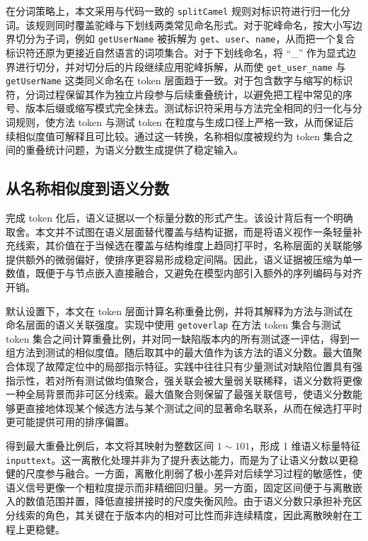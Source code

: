 在分词策略上，本文采用与代码一致的 \texttt{splitCamel} 规则对标识符进行归一化分词。该规则同时覆盖驼峰与下划线两类常见命名形式。对于驼峰命名，按大小写边界切分为子词，例如 \texttt{getUserName} 被拆解为 \texttt{get}、\texttt{user}、\texttt{name}，从而把一个复合标识符还原为更接近自然语言的词项集合。对于下划线命名，将 ``\_'' 作为显式边界进行切分，并对切分后的片段继续应用驼峰拆解，从而使 \texttt{get\_user\_name} 与 \texttt{getUserName} 这类同义命名在 token 层面趋于一致。对于包含数字与缩写的标识符，分词过程保留其作为独立片段参与后续重叠统计，以避免把工程中常见的序号、版本后缀或缩写模式完全抹去。测试标识符采用与方法完全相同的归一化与分词规则，使方法 token 与测试 token 在粒度与生成口径上严格一致，从而保证后续相似度值可解释且可比较。通过这一转换，名称相似度被规约为 token 集合之间的重叠统计问题，为语义分数生成提供了稳定输入。

\subsection{从名称相似度到语义分数}

完成 token 化后，语义证据以一个标量分数的形式产生。该设计背后有一个明确取舍。本文并不试图在语义层面替代覆盖与结构证据，而是将语义视作一条轻量补充线索，其价值在于当候选在覆盖与结构维度上趋同打平时，名称层面的关联能够提供额外的微弱偏好，使排序更容易形成稳定间隔。因此，语义证据被压缩为单一数值，既便于与节点嵌入直接融合，又避免在模型内部引入额外的序列编码与对齐开销。

默认设置下，本文在 token 层面计算名称重叠比例，并将其解释为方法与测试在命名层面的语义关联强度。实现中使用 \texttt{getoverlap} 在方法 token 集合与测试 token 集合之间计算重叠比例，并对同一缺陷版本内的所有测试逐一评估，得到一组方法到测试的相似度值。随后取其中的最大值作为该方法的语义分数。最大值聚合体现了故障定位中的局部指示特征。实践中往往只有少量测试对缺陷位置具有强指示性，若对所有测试做均值聚合，强关联会被大量弱关联稀释，语义分数将更像一种全局背景而非可区分线索。最大值聚合则保留了最强关联信号，使语义分数能够更直接地体现某个候选方法与某个测试之间的显著命名联系，从而在候选打平时更可能提供可用的排序偏置。

得到最大重叠比例后，本文将其映射为整数区间 $1\!\sim\!101$，形成 1 维语义标量特征 \texttt{inputtext}。这一离散化处理并非为了提升表达能力，而是为了让语义分数以更稳健的尺度参与融合。一方面，离散化削弱了极小差异对后续学习过程的敏感性，使语义信号更像一个粗粒度提示而非精细回归量。另一方面，固定区间便于与离散嵌入的数值范围并置，降低直接拼接时的尺度失衡风险。由于语义分数只承担补充区分线索的角色，其关键在于版本内的相对可比性而非连续精度，因此离散映射在工程上更稳健。

